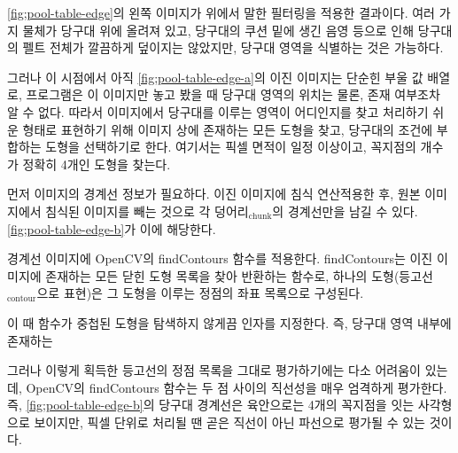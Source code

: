 \documentclass[11pt]{oblivoir}
\begin{document}

    \cref{fig;pool-table-edge}의 왼쪽 이미지가 위에서 말한 필터링을 적용한 결과이다. \footnotemark 여러 가지 물체가 당구대 위에 올려져 있고, 당구대의 쿠션 밑에 생긴 음영 등으로 인해 당구대의 펠트 전체가 깔끔하게 덮이지는 않았지만, 당구대 영역을 식별하는 것은 가능하다.

    그러나 이 시점에서 아직 \cref{fig;pool-table-edge-a}의 이진 이미지는 단순힌 부울 값 배열로, 프로그램은 이 이미지만 놓고 봤을 때 당구대 영역의 위치는 물론, 존재 여부조차 알 수 없다. 따라서 이미지에서 당구대를 이루는 영역이 어디인지를 찾고 처리하기 쉬운 형태로 표현하기 위해 이미지 상에 존재하는 모든 도형을 찾고, 당구대의 조건에 부합하는 도형을 선택하기로 한다. 여기서는 픽셀 면적이 일정 이상이고, 꼭지점의 개수가 정확히 4개인 도형을 찾는다.

    먼저 이미지의 경계선 정보가 필요하다. 이진 이미지에 침식 연산 적용한 후, 원본 이미지에서 침식된 이미지를 빼는 것으로 각 덩어리$_\text{chunk}$의 경계선만을 남길 수 있다. \cref{fig;pool-table-edge-b}가 이에 해당한다.

    경계선 이미지에 OpenCV의 findContours 함수를 적용한다.\cite{findContours} findContours는 이진 이미지에 존재하는 모든 닫힌 도형 목록을 찾아 반환하는 함수로, 하나의 도형(등고선$_\text{contour}$으로 표현)은 그 도형을 이루는 정점의 좌표 목록으로 구성된다.
    
    이 때 함수가 중첩된 도형을 탐색하지 않게끔 인자를 지정한다. 즉, 당구대 영역 내부에 존재하는 
    
    그러나 이렇게 획득한 등고선의 정점 목록을 그대로 평가하기에는 다소 어려움이 있는데, OpenCV의 findContours 함수는 두 점 사이의 직선성을 매우 엄격하게 평가한다. 즉, \cref{fig;pool-table-edge-b}의 당구대 경계선은 육안으로는 4개의 꼭지점을 잇는 사각형으로 보이지만, 픽셀 단위로 처리될 땐 곧은 직선이 아닌 파선으로 평가될 수 있는 것이다.
    
\end{document}
